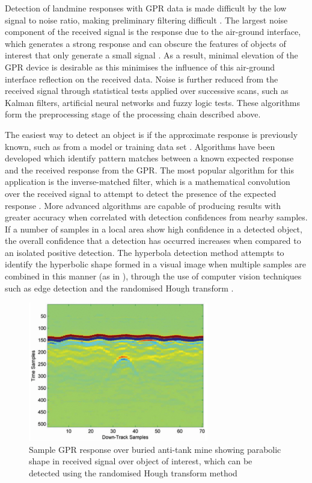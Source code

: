 \documentclass[main.tex]{subfiles}
\begin{document}
Detection of landmine responses with GPR data is made difficult by the low signal to noise ratio, making preliminary filtering difficult \parencite{shresta2003}. The largest noise component of the received signal is the response due to the air-ground interface, which generates a strong response and can obscure the features of objects of interest that only generate a small signal \parencite{Yarovoy2009}. As a result, minimal elevation of the GPR device is desirable as this minimises the influence of this air-ground interface reflection on the received data. Noise is further reduced from the received signal through statistical tests applied over successive scans, such as Kalman filters, artificial neural networks and fuzzy logic tests. These algorithms form the preprocessing stage of the processing chain described above.

The easiest way to detect an object is if the approximate response is previously known, such as from a model or training data set \parencite{Yarovoy2009}. Algorithms have been developed which identify pattern matches between a known expected response and the received response from the GPR. The most popular algorithm for this application is the inverse-matched filter, which is a mathematical convolution over the received signal to attempt to detect the presence of the expected response \parencite{Osumi1984}. More advanced algorithms are capable of producing results with greater accuracy when correlated with detection confidences from nearby samples. If a number of samples in a local area show high confidence in a detected object, the overall confidence that a detection has occurred increases when compared to an isolated positive detection. The hyperbola detection method attempts to identify the hyperbolic shape formed in a visual image when multiple samples are combined in this manner (as in ), through the use of computer vision techniques such as edge detection and the randomised Hough transform \parencite{Xu1990}.
\begin{figure}[ht]
\includegraphics[width=0.7\textwidth]{2-LiteratureReview/GPR-sample.png}
\centering
\caption[Sample GPR response over buried anti-tank mine]{Sample GPR response over buried anti-tank mine showing parabolic shape in received signal over object of interest, which can be detected using the randomised Hough transform method} 
\end{figure}
\end{document}
